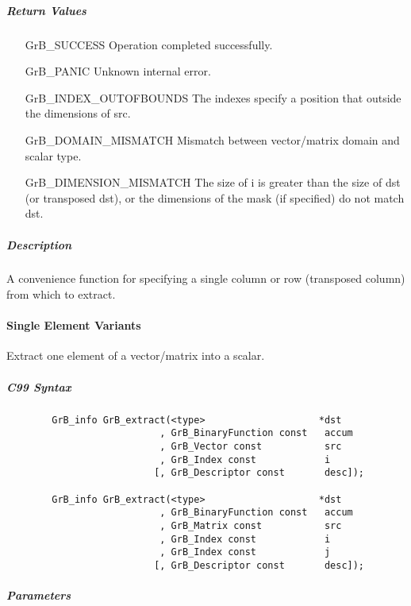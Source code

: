 \subparagraph{Return Values}

\begin{itemize}[leftmargin=2.1in]
\item[{\sf GrB\_SUCCESS}]             Operation completed successfully.
\item[{\sf GrB\_PANIC}]               Unknown internal error.
\item[{\sf GrB\_INDEX\_OUTOFBOUNDS}]  The indexes specify a position that outside the dimensions of src.
\item[{\sf GrB\_DOMAIN\_MISMATCH}]    Mismatch between vector/matrix domain and scalar type.
\item[{\sf GrB\_DIMENSION\_MISMATCH}] 
       The size of {\sf i} is greater than the size of {\sf dst} (or transposed {\sf dst}), 
       or the dimensions of the mask (if specified) do not match dst.
\end{itemize}

\subparagraph{Description}

A convenience function for specifying a single column or row (transposed column) from which to extract.

\paragraph{Single Element Variants}

Extract one element of a vector/matrix into a scalar. 

\subparagraph{C99 Syntax}

\begin{verbatim}
        GrB_info GrB_extract(<type>                    *dst
                           , GrB_BinaryFunction const   accum
                           , GrB_Vector const           src
                           , GrB_Index const            i
                          [, GrB_Descriptor const       desc]); 

        GrB_info GrB_extract(<type>                    *dst
                           , GrB_BinaryFunction const   accum
                           , GrB_Matrix const           src
                           , GrB_Index const            i
                           , GrB_Index const            j
                          [, GrB_Descriptor const       desc]); 

\end{verbatim}

\subparagraph{Parameters}

